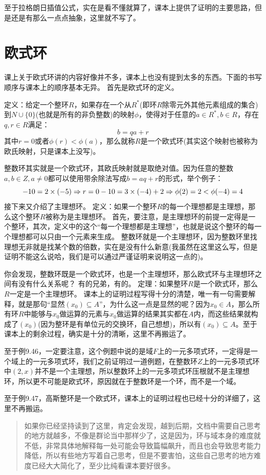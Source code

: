 \documentclass[12pt, a4paper, oneside]{ctexart}
\newenvironment{myquote}{\begin{quote}\small\color{gray}}{\end{quote}}
\begin{document}
至于拉格朗日插值公式，实在是看不懂就算了，课本上提供了证明的主要思路，但是还是有那么一点点抽象，这里就不写了。

\section{欧式环}

课上关于欧式环讲的内容好像并不多，课本上也没有提到太多的东西。下面的书写顺序与课本上的顺序基本无异。
首先是欧式环的定义。

定义：给定一个整环$R$，如果存在一个从$R^*$(即环$R$除零元外其他元素组成的集合)到$N\cup\{0\}$(也就是所有的非负整数)的映射$\phi$，使得对于任意的$a\in R^*,b\in R$，存在$q,r\in R$满足：
\[
b=qa+r
\]
其中$r=0$或者$\phi(r)<\phi(a)$，那么就称$R$是一个欧式环(其实这个映射也被称为欧氏映射，只是课本上没写)。

整数环其实就是一个欧式环，其欧氏映射就是取绝对值。因为任意的整数$a,b\in Z,a\neq 0$都可以使用带余除法写成$b=aq+r$的形式，举个例子：
\[
-10=2\times (-5)\Rightarrow r=0\\
-10=3\times(-4)+2\Rightarrow \phi(2)=2<\phi(-4)=4
\]
接下来又介绍了主理想环。
定义：如果一个整环$R$的每一个理想都是主理想，那么这个整环$R$被称为是主理想环。
首先，要注意，是主理想环的前提一定得是一个整环，其次，定义中的这个“每一个理想都是主理想”，也就是说这个整环的每一个理想都可以只由一个元素来生成。
整数环就是一个主理想环，因为整数环里找理想无非就是找某个数的倍数，实在是没有什么新意(我虽然在这里这么写，但是证明不能这么说哈，我们是可以通过严谨证明来说明这一点的)。

你会发现，整数环既是一个欧式环，也是一个主理想环，那么欧式环与主理想环之间有没有什么关系呢？
有的兄弟，有的。
定理：如果整环$R$是一个欧式环，那么$R$一定是一个主理想环。
课本上的证明过程写得十分的清楚，唯一有一句需要解释，就是那句“显然$(x_0)\subseteq A$”，为什么这一点是显然的呢？因为$x_0\in A$，那么所有环$R$中能够与$x_0$做运算的元素与$x_0$做运算的结果其实都在$A$内，而这些结果就构成了$(x_0)$(因为整环是有单位元的交换环，自己想想)，所以有$(x_0)\subseteq A$。至于课本上的剩余过程，确实是十分的清晰，这里不再搬运了。

至于例9.46，一定要注意，这个例题中说的是域$F$上的一元多项式环，一定得是一个域上的一元多项式环，我们之前证明过一道例题，在整数环$Z$上的一元多项式环中$(2,x)$并不是一个主理想，所以整数环上的一元多项式环压根就不是主理想环，所以更不可能是欧式环，原因就在于整数环是一个环，而不是一个域。

至于例9.47，高斯整环是一个欧式环，课本上的证明过程也已经十分的详细了，这里不再搬运。

\begin{myquote}
如果你已经坚持读到了这里，肯定会发现，越到后期，文档中需要自己思考的地方就越多，不像是群论当中那样少了，这是因为，环与域本身的难度就不低，非常具体地解释每一处可能会导致篇幅飙升，而且也会导致思考能力降低，所以有些地方写着自己思考，但是不要害怕，这些自己思考的地方难度已经大大简化了，至少比纯看课本要好很多。
\end{myquote}
\end{document}
